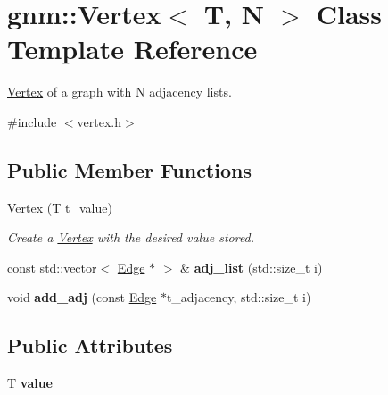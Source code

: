 \hypertarget{classgnm_1_1_vertex}{}\section{gnm\+:\+:Vertex$<$ T, N $>$ Class Template Reference}
\label{classgnm_1_1_vertex}


\hyperlink{classgnm_1_1_vertex}{Vertex} of a graph with N adjacency lists.  




{\ttfamily \#include $<$vertex.\+h$>$}

\subsection*{Public Member Functions}
\begin{DoxyCompactItemize}
\item 
\hyperlink{classgnm_1_1_vertex_a0a2362545512a6ab1e8153fec136e6c8}{Vertex} (T t\+\_\+value)
\begin{DoxyCompactList}\small\item\em Create a \hyperlink{classgnm_1_1_vertex}{Vertex} with the desired value stored. \end{DoxyCompactList}\item 
const std\+::vector$<$ \hyperlink{classgnm_1_1_edge}{Edge} $\ast$ $>$ \& {\bfseries adj\+\_\+list} (std\+::size\+\_\+t i)\hypertarget{classgnm_1_1_vertex_a0b2cedea80de0423c0d623672c81ab73}{}\label{classgnm_1_1_vertex_a0b2cedea80de0423c0d623672c81ab73}

\item 
void {\bfseries add\+\_\+adj} (const \hyperlink{classgnm_1_1_edge}{Edge} $\ast$t\+\_\+adjacency, std\+::size\+\_\+t i)\hypertarget{classgnm_1_1_vertex_af51fe71b9c41071f2fb06ee38b8a35b0}{}\label{classgnm_1_1_vertex_af51fe71b9c41071f2fb06ee38b8a35b0}

\end{DoxyCompactItemize}
\subsection*{Public Attributes}
\begin{DoxyCompactItemize}
\item 
T {\bfseries value}\hypertarget{classgnm_1_1_vertex_a1ae4e06b3e84c754b907655052d5e717}{}\label{classgnm_1_1_vertex_a1ae4e06b3e84c754b907655052d5e717}

\end{DoxyCompactItemize}


